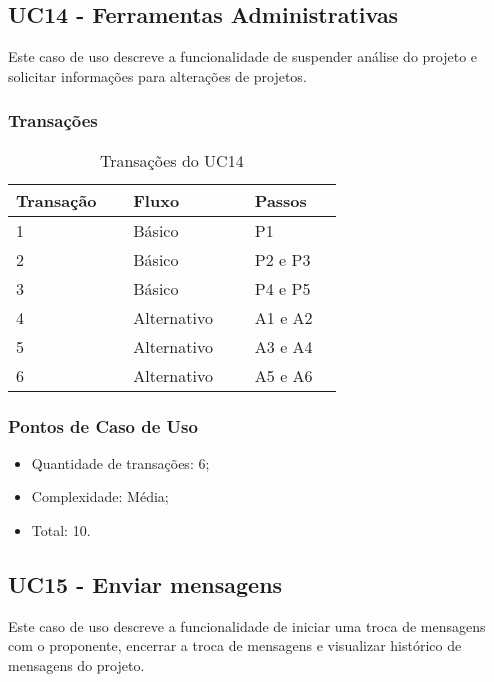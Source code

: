 \pagebreak
\subsection{UC14 - Ferramentas Administrativas}
   
  Este caso de uso descreve a funcionalidade de suspender análise do projeto e solicitar informações para alterações de projetos.
  
  \subsubsection{Transações}

  \begin{table*}[!h]
  \centering
  \caption{Transações do UC14}
  \label{Rotulo}
    \begin{tabular}{|p{0.20\linewidth}|p{0.25\linewidth}|p{0.20\linewidth}|}
    \hline
    \textbf{Transação} & \textbf{Fluxo} & \textbf{Passos} \\ 
    \hline
    1 & Básico & P1\\
    \hline
    2 & Básico & P2 e P3\\
    \hline
    3 & Básico & P4 e P5\\
    \hline
    4 & Alternativo & A1 e A2\\
    \hline
    5 & Alternativo & A3 e A4\\
    \hline
    6 & Alternativo & A5 e A6\\
    \hline
    \end{tabular}
  \end{table*}

  \subsubsection{Pontos de Caso de Uso}

  \begin{itemize}
  \item Quantidade de transações: 6;
  \item Complexidade: Média;
  \item Total: 10.
  \end{itemize}

  \vfill

\pagebreak
\subsection{UC15 - Enviar mensagens}
  
  Este caso de uso descreve a funcionalidade de iniciar uma troca de
  mensagens com o proponente, encerrar a troca de mensagens e visualizar histórico de mensagens do projeto. 
  
